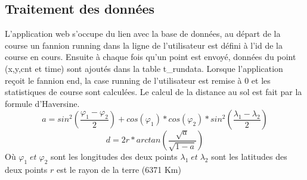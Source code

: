 \documentclass[a4paper,11pt]{article}
\begin{document}
\subsection{Traitement des données}
L'application web s'occupe du lien avec la base de données, au départ de la course un fannion running dans la ligne de l'utilisateur est défini à l'id de la course en cours.\newline
Ensuite à chaque fois qu'un point est envoyé, données du point (x,y,cnt et time) sont ajoutés dans la table t\_rundata.\newline
Lorsque l'application reçoit le fannion end, la case running de l'utilisateur est remise à 0 et les statistiques de course sont calculées.
Le calcul de la distance au sol est fait par la formule d'Haversine.
\begin{equation*}
a = sin^2(\frac{\varphi_1 - \varphi_2}{2}) + cos(\varphi_1) * cos(\varphi_2) * sin^2(\frac{\lambda_1 - \lambda_2}{2})
\end{equation*}
\begin{equation*}
d = 2r *arctan\left(\frac{\sqrt{a}}{\sqrt{1-a}}\right)
\end{equation*}
Où \newline
$\varphi_1 \; et \; \varphi_2$ sont les longitudes des deux points\newline
$\lambda_1 \; et \; \lambda_2$ sont les latitudes des deux points\newline
$r$ est le rayon de la terre (6371 Km)\newline
\end{document}
